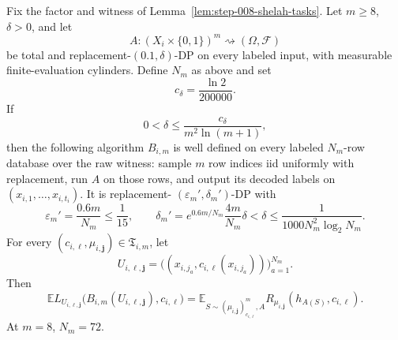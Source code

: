 \begin{lemma}
\label{lem:step-008-resampling}
Fix the factor and witness of Lemma~\ref{lem:step-008-shelah-tasks}.  Let
\(m\ge8\), \(\delta>0\), and let
\[
A:(X_i\times\{0,1\})^m\rightsquigarrow(\Omega,\mathscr F)
\]
be total and replacement-\((0.1,\delta)\)-DP on every labeled input, with
measurable finite-evaluation cylinders.  Define \(N_m\) as above and set
\begin{equation}\label{eq:step-008-cdelta}
c_\delta=\frac{\ln2}{200000}.
\end{equation}
If
\begin{equation}\label{eq:step-008-candidate-delta}
0<\delta\le\frac{c_\delta}{m^2\ln(m+1)},
\end{equation}
then the following algorithm \(B_{i,m}\) is well defined on every labeled
\(N_m\)-row database over the raw witness: sample \(m\) row indices iid
uniformly with replacement, run \(A\) on those rows, and output its decoded
labels on \((x_{i,1},\ldots,x_{i,t_i})\).  It is replacement-
\((\varepsilon_m',\delta_m')\)-DP with
\begin{equation}\label{eq:step-008-resampled-privacy}
\varepsilon_m'=\frac{0.6m}{N_m}\le\frac1{15},
\qquad
\delta_m'=e^{0.6m/N_m}\frac{4m}{N_m}\delta
<\delta
\le\frac1{1000N_m^2\log_2N_m}.
\end{equation}
For every \((c_{i,\ell},\mu_{i,\mathbf j})\in\mathfrak T_{i,m}\), let
\[
U_{i,\ell,\mathbf j}
=\bigl((x_{i,j_a},c_{i,\ell}(x_{i,j_a}))\bigr)_{a=1}^{N_m}.
\]
Then
\begin{equation}\label{eq:step-008-risk-identity}
\mathbb E L_{U_{i,\ell,\mathbf j}}
\bigl(B_{i,m}(U_{i,\ell,\mathbf j}),c_{i,\ell}\bigr)
=\mathbb E_{S\sim(\mu_{i,\mathbf j})_{c_{i,\ell}}^m,A}
R_{\mu_{i,\mathbf j}}(h_{A(S)},c_{i,\ell}).
\end{equation}
At \(m=8\), \(N_m=72\).
\end{lemma}

